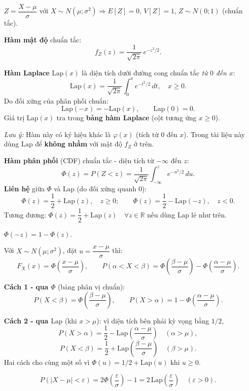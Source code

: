 \documentclass[12pt,a4paper]{article}
\begin{document}
\begin{dinhnghia}
  $Z = \dfrac{X - \mu}{\sigma}$ với $X \sim N(\mu;\sigma^2) \Rightarrow E[Z] = 0$, $V[Z] = 1$, $Z \sim N(0;1)$ (chuẩn tắc).

  \textbf{Hàm mật độ} chuẩn tắc:
  \[
    f_Z(z) = \dfrac{1}{\sqrt{2\pi}}\, e^{-z^2/2}.
  \]
\end{dinhnghia}

\begin{dinhnghia}[title={Hàm Laplace}]
  \textbf{Hàm Laplace} $\mathrm{Lap}(x)$ là diện tích dưới đường cong chuẩn tắc \emph{từ $0$ đến $x$}:
  \[
    \mathrm{Lap}(x) = \dfrac{1}{\sqrt{2\pi}} \int_0^x e^{-t^2/2}\,dt, \quad x \ge 0.
  \]
  Do đối xứng của phân phối chuẩn:
  \[
    \mathrm{Lap}(-x) = -\mathrm{Lap}(x), \qquad \mathrm{Lap}(0) = 0.
  \]
  Giá trị $\mathrm{Lap}(x)$ tra trong \textbf{bảng hàm Laplace} (cột tương ứng $x \ge 0$).

  \emph{Lưu ý:} Hàm này có ký hiệu khác là $\varphi(x)$ (tích từ $0$ đến $x$). Trong tài liệu này dùng $\mathrm{Lap}$ để \textbf{không nhầm} với mật độ $f_Z$ ở trên.
\end{dinhnghia}

\begin{dinhnghia}[title={Hàm phân phối tích lũy $\Phi$}]
  \textbf{Hàm phân phối} (CDF) chuẩn tắc - diện tích từ $-\infty$ đến $z$:
  \[
    \Phi(z) = P(Z < z) = \dfrac{1}{\sqrt{2\pi}} \int_{-\infty}^{z} e^{-u^2/2}\,du.
  \]
  \textbf{Liên hệ} giữa $\Phi$ và $\mathrm{Lap}$ (do đối xứng quanh $0$):
  \[
    \Phi(z) = \dfrac{1}{2} + \mathrm{Lap}(z), \quad z \ge 0; \qquad
    \Phi(z) = \dfrac{1}{2} - \mathrm{Lap}(-z), \quad z < 0.
  \]
  Tương đương: $\Phi(z) = \dfrac{1}{2} + \mathrm{Lap}(z) \quad \forall z \in \mathbb{R}$ nếu dùng $\mathrm{Lap}$ lẻ như trên.
\end{dinhnghia}

\begin{dinhly}
  $\Phi(-z) = 1 - \Phi(z)$.

  Với $X \sim N(\mu;\sigma^2)$, đặt $u = \dfrac{x - \mu}{\sigma}$ thì:
  \[
    F_X(x) = \Phi\!\left(\dfrac{x-\mu}{\sigma}\right), \qquad
    P(\alpha < X < \beta) = \Phi\!\left(\dfrac{\beta-\mu}{\sigma}\right) - \Phi\!\left(\dfrac{\alpha-\mu}{\sigma}\right).
  \]

  \textbf{Cách 1 - qua $\Phi$} (bảng phân vị chuẩn):
  \[
    P(X < \beta) = \Phi\!\left(\dfrac{\beta-\mu}{\sigma}\right), \qquad
    P(X > \alpha) = 1 - \Phi\!\left(\dfrac{\alpha-\mu}{\sigma}\right).
  \]

  \textbf{Cách 2 - qua $\mathrm{Lap}$} (khi $x > \mu$):
  vì diện tích bên phải kỳ vọng bằng $1/2$,
  \[
    P(X > \alpha) = \dfrac{1}{2} - \mathrm{Lap}\!\left(\dfrac{\alpha - \mu}{\sigma}\right)
    \quad (\alpha > \mu),
  \]
  \[
    P(X < \beta) = \dfrac{1}{2} + \mathrm{Lap}\!\left(\dfrac{\beta - \mu}{\sigma}\right)
    \quad (\beta > \mu).
  \]
  Hai cách cho cùng một số vì $\Phi(u) = 1/2 + \mathrm{Lap}(u)$ khi $u \ge 0$.

  \[
    P(|X - \mu| < \varepsilon) = 2\Phi\!\left(\dfrac{\varepsilon}{\sigma}\right) - 1
    = 2\,\mathrm{Lap}\!\left(\dfrac{\varepsilon}{\sigma}\right) \quad (\varepsilon > 0).
  \]
\end{dinhly}
\end{document}
